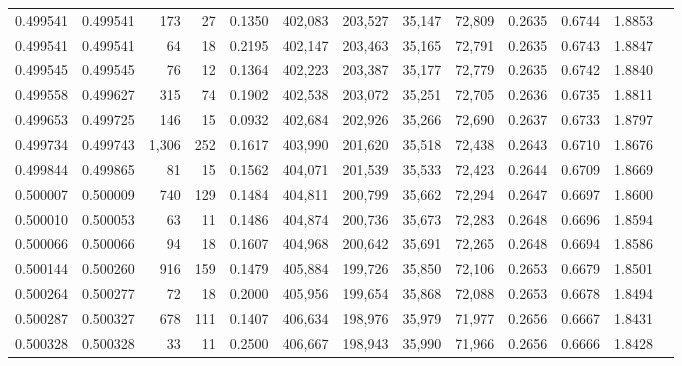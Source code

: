 \begin{tabular}{rrrrrrrrrrrrr}
0.499541 & 0.499541 &   173 &    27 &                                     0.1350 & 402,083 & 203,527 &  35,147 &  72,809 & 0.2635 & 0.6744 & 1.8853 \\
0.499541 & 0.499541 &    64 &    18 &                                     0.2195 & 402,147 & 203,463 &  35,165 &  72,791 & 0.2635 & 0.6743 & 1.8847 \\
0.499545 & 0.499545 &    76 &    12 &                                     0.1364 & 402,223 & 203,387 &  35,177 &  72,779 & 0.2635 & 0.6742 & 1.8840 \\
0.499558 & 0.499627 &   315 &    74 &                                     0.1902 & 402,538 & 203,072 &  35,251 &  72,705 & 0.2636 & 0.6735 & 1.8811 \\
0.499653 & 0.499725 &   146 &    15 &                                     0.0932 & 402,684 & 202,926 &  35,266 &  72,690 & 0.2637 & 0.6733 & 1.8797 \\
0.499734 & 0.499743 & 1,306 &   252 &                                     0.1617 & 403,990 & 201,620 &  35,518 &  72,438 & 0.2643 & 0.6710 & 1.8676 \\
0.499844 & 0.499865 &    81 &    15 &                                     0.1562 & 404,071 & 201,539 &  35,533 &  72,423 & 0.2644 & 0.6709 & 1.8669 \\
0.500007 & 0.500009 &   740 &   129 &                                     0.1484 & 404,811 & 200,799 &  35,662 &  72,294 & 0.2647 & 0.6697 & 1.8600 \\
0.500010 & 0.500053 &    63 &    11 &                                     0.1486 & 404,874 & 200,736 &  35,673 &  72,283 & 0.2648 & 0.6696 & 1.8594 \\
0.500066 & 0.500066 &    94 &    18 &                                     0.1607 & 404,968 & 200,642 &  35,691 &  72,265 & 0.2648 & 0.6694 & 1.8586 \\
0.500144 & 0.500260 &   916 &   159 &                                     0.1479 & 405,884 & 199,726 &  35,850 &  72,106 & 0.2653 & 0.6679 & 1.8501 \\
0.500264 & 0.500277 &    72 &    18 &                                     0.2000 & 405,956 & 199,654 &  35,868 &  72,088 & 0.2653 & 0.6678 & 1.8494 \\
0.500287 & 0.500327 &   678 &   111 &                                     0.1407 & 406,634 & 198,976 &  35,979 &  71,977 & 0.2656 & 0.6667 & 1.8431 \\
0.500328 & 0.500328 &    33 &    11 &                                     0.2500 & 406,667 & 198,943 &  35,990 &  71,966 & 0.2656 & 0.6666 & 1.8428 \\

\end{tabular}
